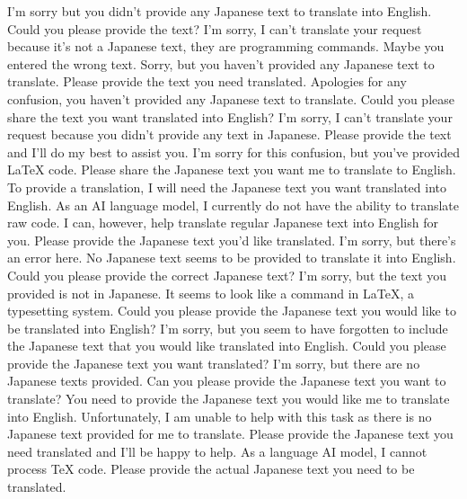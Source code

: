 {%
I'm sorry but you didn't provide any Japanese text to translate into English. Could you please provide the text?
I'm sorry, I can't translate your request because it's not a Japanese text, they are programming commands. Maybe you entered the wrong text.
Sorry, but you haven't provided any Japanese text to translate. Please provide the text you need translated.
Apologies for any confusion, you haven't provided any Japanese text to translate. Could you please share the text you want translated into English?
I'm sorry, I can't translate your request because you didn't provide any text in Japanese. Please provide the text and I'll do my best to assist you.
I'm sorry for this confusion, but you've provided LaTeX code. Please share the Japanese text you want me to translate to English.
To provide a translation, I will need the Japanese text you want translated into English.
As an AI language model, I currently do not have the ability to translate raw code. I can, however, help translate regular Japanese text into English for you. Please provide the Japanese text you'd like translated.
I'm sorry, but there's an error here. No Japanese text seems to be provided to translate it into English. Could you please provide the correct Japanese text?
I’m sorry, but the text you provided is not in Japanese. It seems to look like a command in LaTeX, a typesetting system. Could you please provide the Japanese text you would like to be translated into English?
I'm sorry, but you seem to have forgotten to include the Japanese text that you would like translated into English. Could you please provide the Japanese text you want translated?
I'm sorry, but there are no Japanese texts provided. Can you please provide the Japanese text you want to translate?
You need to provide the Japanese text you would like me to translate into English.
Unfortunately, I am unable to help with this task as there is no Japanese text provided for me to translate. Please provide the Japanese text you need translated and I'll be happy to help.
As a language AI model, I cannot process TeX code. Please provide the actual Japanese text you need to be translated.
}
